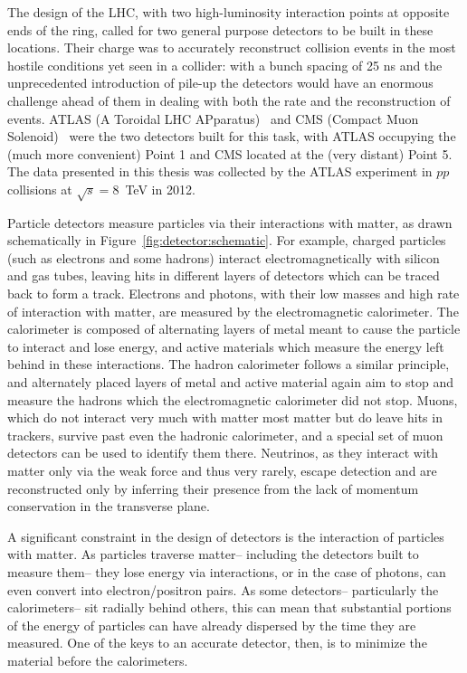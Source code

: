 \label{chapter:detector}

The design of the LHC, with two high-luminosity interaction points at opposite ends of the ring, called for two general purpose detectors to be built in these locations. Their charge was to accurately reconstruct collision events in the most hostile conditions yet seen in a collider: with a bunch spacing of 25 ns and the unprecedented introduction of pile-up the detectors would have an enormous challenge ahead of them in dealing with both the rate and the reconstruction of events. ATLAS (A Toroidal LHC APparatus)~\cite{ATLASPaper} and CMS (Compact Muon Solenoid)~\cite{CMSPaper} were the two detectors built for this task, with ATLAS occupying the (much more convenient) Point 1 and CMS located at the (very distant) Point 5. The data presented in this thesis was collected by the ATLAS experiment in $pp$ collisions at $\sqrt{s} = 8$~TeV in 2012. 

Particle detectors measure particles via their interactions with matter, as drawn schematically in Figure~\ref{fig:detector:schematic}. For example, charged particles (such as electrons and some hadrons) interact electromagnetically with silicon and gas tubes, leaving hits in different layers of detectors which can be traced back to form a track. Electrons and photons, with their low masses and high rate of interaction with matter, are measured by the electromagnetic calorimeter. The calorimeter is composed of alternating layers of metal meant to cause the particle to interact and lose energy, and active materials which measure the energy left behind in these interactions. The hadron calorimeter follows a similar principle, and alternately placed layers of metal and active material again aim to stop and measure the hadrons which the electromagnetic calorimeter did not stop. Muons, which do not interact very much with matter most matter but do leave hits in trackers, survive past even the hadronic calorimeter, and a special set of muon detectors can be used to identify them there. Neutrinos, as they interact with matter only via the weak force and thus very rarely, escape detection and are reconstructed only by inferring their presence from the lack of momentum conservation in the transverse plane.

A significant constraint in the design of detectors is the interaction of particles with matter.  As particles traverse matter-- including the detectors built to measure them-- they lose energy via interactions, or in the case of photons, can even convert into electron/positron pairs. As some detectors-- particularly the calorimeters-- sit radially behind others, this can mean that substantial portions of the energy of particles can have already dispersed by the time they are measured. One of the keys to an accurate detector, then, is to minimize the material before the calorimeters. 


